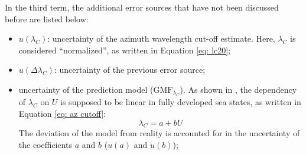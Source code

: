 In the third term, the additional error sources that have not been discussed before are listed below:
\begin{itemize}
	\item $u(\lambda_{C})$: uncertainty of the azimuth wavelength cut-off estimate. Here, $\lambda_{C}$ is considered ``normalized'', as written in Equation \ref{eq: lc20};
	\item $u(\Delta \lambda_{C})$: uncertainty of the previous error source;
	\item uncertainty of the prediction model ($\mathrm{GMF}_{\lambda_{C}}$). As shown in \cite{CorcioneTGRS2019,GriecoIJRS2016}, the dependency of $\lambda_{C}$ on $U$ is supposed to be linear in fully developed sea states, as written in Equation \ref{eq: az cutoff}:
	\begin{equation}
		\lambda_{C}=a+bU
		\label{eq: az cutoff}
	\end{equation}
	The deviation of the model from reality is accounted for in the uncertainty of the coefficients $a$ and $b$ ($u(a)$ and $u(b)$);
\end{itemize}


